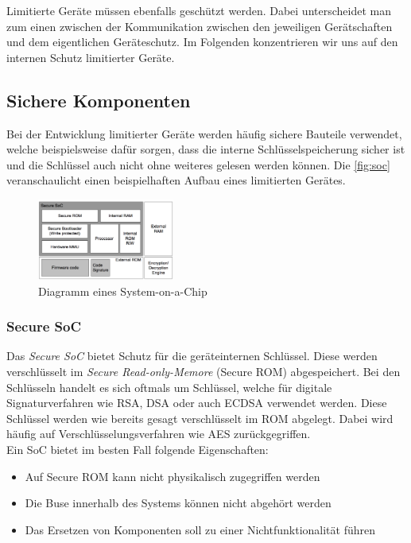 \documentclass[conference]{IEEEtran}
\begin{document}
Limitierte Geräte müssen ebenfalls geschützt werden. Dabei unterscheidet man zum einen zwischen der Kommunikation zwischen den jeweiligen Gerätschaften und dem eigentlichen Geräteschutz. Im Folgenden konzentrieren wir uns auf den internen Schutz limitierter Geräte.

\subsection{Sichere Komponenten}

Bei der Entwicklung limitierter Geräte werden häufig sichere Bauteile verwendet, welche beispielsweise dafür sorgen, dass die interne Schlüsselspeicherung sicher ist und die Schlüssel auch nicht ohne weiteres gelesen werden können.
Die \autoref{fig:soc} veranschaulicht einen beispielhaften Aufbau eines limitierten Gerätes.

\begin{figure}[h]
\centering
  \includegraphics[width=0.4\textwidth]{soc}
  \caption{Diagramm eines System-on-a-Chip}
  \label{fig:soc}
\end{figure}

\subsubsection{Secure SoC} Das \textit{Secure SoC} bietet Schutz für die geräteinternen Schlüssel. Diese werden verschlüsselt im \textit{Secure Read-only-Memore} (Secure ROM) abgespeichert. Bei den Schlüsseln handelt es sich oftmals um Schlüssel, welche für digitale Signaturverfahren wie RSA, DSA oder auch ECDSA verwendet werden. Diese Schlüssel werden wie bereits gesagt verschlüsselt im ROM abgelegt. Dabei wird häufig auf Verschlüsselungsverfahren wie AES zurückgegriffen.\cite{anoopms}\\
\newpage
Ein SoC bietet im besten Fall folgende Eigenschaften: 
\begin{itemize}
  \item Auf Secure ROM kann nicht physikalisch zugegriffen werden 
  \item Die Buse innerhalb des Systems können nicht abgehört werden
  \item Das Ersetzen von Komponenten soll zu einer Nichtfunktionalität führen 
\end{itemize} 
\end{document}
